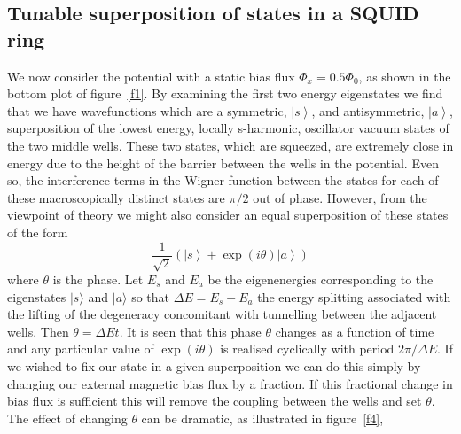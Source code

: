 \documentclass[12pt,a4paper,superscriptaddress,showpacs,floatfix,pra]{revtex4-2}
\begin{document}
\subsection{Tunable superposition of states in a SQUID ring}

We  now  consider  the  potential   with  a  static  bias  flux  $\Phi
_{x}=0.5\Phi   _{0}   $,   as    shown   in   the   bottom   plot   of
figure~\ref{f1}. By examining the first two energy eigenstates we find
that  we  have  wavefunctions   which  are  a  symmetric,  $\left\vert
s\right\rangle  $, and  antisymmetric,  $\left\vert a\right\rangle  $,
superposition  of the  lowest energy,  locally  s-harmonic, oscillator
vacuum states  of the  two middle wells.  These two states,  which are
squeezed,  are extremely  close in  energy due  to the  height  of the
barrier between the wells in  the potential. Even so, the interference
terms  in the Wigner  function between  the states  for each  of these
macroscopically distinct  states are $\pi  /2$ out of  phase. However,
from  the  viewpoint  of  theory  we  might  also  consider  an  equal
superposition of these states of the form
\begin{equation}
\frac{1}{\sqrt{2}}\left( \left\vert s\right\rangle +\exp (i\theta
)\left\vert a\right\rangle \right)  \label{phaseequ}
\end{equation}
where $\theta $ is the phase. Let $E_{s}$ and $E_{a}$ be the
eigenenergies  corresponding  to  the  eigenstates $|s\rangle  $  and
$|a\rangle  $ so  that  $\Delta E=E_{s}-E_{a}$  the energy  splitting
associated  with  the  lifting  of  the  degeneracy  concomitant  with
tunnelling between the adjacent wells. Then $\theta =\Delta Et$. It is
seen that this phase $\theta $  changes as a function of time and any
particular  value of $\exp  (i\theta )$  is realised  cyclically with
period $2\pi  /\Delta E$.  If we wished  to fix  our state in  a given
superposition we can do this  simply by changing our external magnetic
bias flux  by a fraction.  If this fractional  change in bias  flux is
sufficient this  will remove  the coupling between  the wells  and set
$\theta  $. The  effect  of changing  $\theta  $ can  be dramatic,  as
illustrated in figure~\ref{f4},
\end{document}
